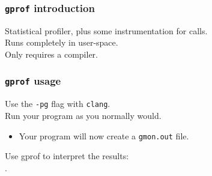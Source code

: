 \begin{frame}
  \frametitle{{\tt gprof} introduction}

  

\begin{changemargin}{1.5cm}
\vspace*{-3em}
    Statistical profiler, plus some instrumentation for calls.\\[1em]
    Runs completely in user-space.\\[1em]
    Only requires a compiler.
    \end{changemargin}
\end{frame}

\begin{frame}
  \frametitle{{\tt gprof} usage}

  

\begin{changemargin}{1.5cm}
\vspace*{-3em}
    Use the {\tt -pg} flag with {\tt clang}.\\[1em]
    Run your program as you normally would.
      \begin{itemize}
        \item Your program will now create a {\tt gmon.out} file.
      \end{itemize}

    Use gprof to interpret the results:\\
 .
    \end{changemargin}
\end{frame}

